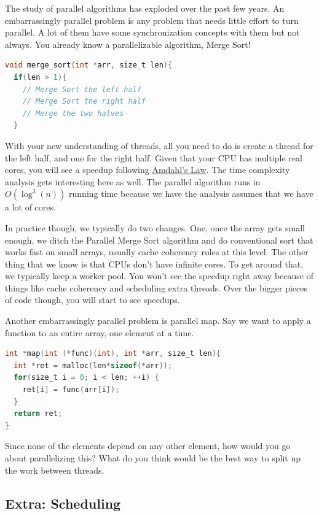 The study of parallel algorithms has exploded over the past few years.
An embarrassingly parallel problem is any problem that needs little effort to turn parallel.
A lot of them have some synchronization concepts with them but not always.
You already know a parallelizable algorithm, Merge Sort!

\begin{lstlisting}[language=C]
void merge_sort(int *arr, size_t len){
  if(len > 1){
    // Merge Sort the left half
    // Merge Sort the right half
    // Merge the two halves
  }
\end{lstlisting}

With your new understanding of threads, all you need to do is create a thread for the left half, and one for the right half.
Given that your CPU has multiple real cores, you will see a speedup following \href{https://en.wikipedia.org/wiki/Amdahl's_law}{Amdahl's Law}.
The time complexity analysis gets interesting here as well.
The parallel algorithm runs in $O(\log^3(n))$ running time because we have the analysis assumes that we have a lot of cores.

In practice though, we typically do two changes.
One, once the array gets small enough, we ditch the Parallel Merge Sort algorithm and do conventional sort that works fast on small arrays, usually cache coherency rules at this level.
The other thing that we know is that CPUs don't have infinite cores.
To get around that, we typically keep a worker pool.
You won't see the speedup right away because of things like cache coherency and scheduling extra threads.
Over the bigger pieces of code though, you will start to see speedups.

Another embarrassingly parallel problem is parallel map.
Say we want to apply a function to an entire array, one element at a time.

\begin{lstlisting}[language=C]
int *map(int (*func)(int), int *arr, size_t len){
  int *ret = malloc(len*sizeof(*arr));
  for(size_t i = 0; i < len; ++i) {
    ret[i] = func(arr[i]);
  }
  return ret;
}
\end{lstlisting}

Since none of the elements depend on any other element, how would you go about parallelizing this?
What do you think would be the best way to split up the work between threads.

\subsection{Extra: Scheduling}


